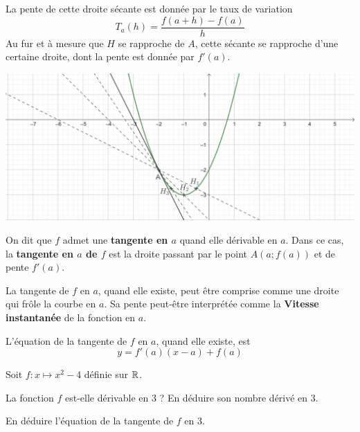 \documentclass{poly}
\begin{document}
\begin{remark}
La pente de cette droite sécante est donnée par le taux de variation
\begin{equation*}
T_a(h) = \dfrac{f(a + h) - f(a)}{h}
\end{equation*}
Au fur et à mesure que $H$ se rapproche de $A$, cette sécante se rapproche d'une certaine droite, dont la pente est donnée par $f'(a)$.
\begin{center}
\includegraphics[width=\textwidth]{Limite_tangente.png}
\end{center}
\end{remark}
\begin{definition}
On dit que $f$ admet une \textbf{tangente en $a$} quand elle dérivable en $a$. Dans ce cas, la \textbf{tangente en $a$ de $f$} est la droite passant par le point $A(a;f(a))$ et de pente $f'(a)$.
\end{definition}
\begin{remark}
La tangente de $f$ en $a$, quand elle existe, peut être comprise comme une droite qui \og frôle \fg la courbe en $a$. Sa pente peut-être interprétée comme la \textbf{Vitesse instantanée} de la fonction en $a$.
\end{remark}
\begin{proposition}
L'équation de la tangente de $f$ en $a$, quand elle existe, est
\begin{equation*}
y = f'(a)(x - a) + f(a)
\end{equation*} 
\end{proposition}
\begin{example}
Soit $f \colon x \mapsto x^2 - 4$ définie sur $\mathbb{R}$.
\begin{alphaquestions}
\item La fonction $f$ est-elle dérivable en $3$ ? En déduire son nombre dérivé en $3$.
\item En déduire l'équation de la tangente de $f$ en $3$.
\end{alphaquestions}

\end{example}
\end{document}
